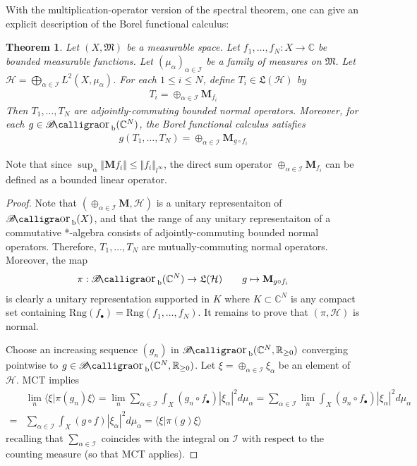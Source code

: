 \documentclass[12pt,b5paper,notitlepage]{article}
\theoremstyle{definition}
\theoremstyle{plain}
\newtheorem{thm}[df]{Theorem}
\DeclareMathOperator{\Borb}{{\mathscr{B}\text{\kern -2pt {\calligra\large or}}\,}_{\mathrm b}}
\newcommand{\fk}{\mathfrak}
\newcommand{\bk}[1]{\langle {#1}\rangle}
\newcommand{\blt}{\bullet}
\newcommand{\Cbb}{\mathbb C}
\newcommand{\Rbb}{\mathbb R}
\newcommand{\Rng}{\mathrm{Rng}}
\newcommand{\MH}{\mathcal H}
\newcommand{\SI}{\mathscr I}
\newcommand{\Mbf}{\mathbf M}
\numberwithin{equation}{section}
\begin{document}
With the multiplication-operator version of the spectral theorem, one can give an explicit description of the Borel functional calculus:





\begin{thm}\label{lb334}
Let $(X,\fk M)$ be a measurable space. Let $f_1,\dots,f_N:X\rightarrow\Cbb$ be bounded measurable functions. Let $(\mu_\alpha)_{\alpha\in\SI}$ be a family of measures on $\fk M$. Let $\MH=\bigoplus_{\alpha\in\SI}L^2(X,\mu_\alpha)$. For each $1\leq i\leq N$, define $T_i\in\fk L(\MH)$ by 
\begin{align*}
T_i=\oplus_{\alpha\in\SI}\Mbf_{f_i}
\end{align*}
Then $T_1,\dots,T_N$ are adjointly-commuting bounded normal operators. Moreover, for each $g\in\Borb(\Cbb^N)$, the Borel functional calculus satisfies
\begin{align}
g(T_1,\dots,T_N)=\oplus_{\alpha\in\SI}\Mbf_{g\circ f_i}
\end{align}
\end{thm}

Note that since $\sup_\alpha\Vert \Mbf f_i\Vert\leq \Vert f_i\Vert_{l^\infty}$, the direct sum operator $\oplus_{\alpha\in\SI}\Mbf_{f_i}$ can be defined as a bounded linear operator.


\begin{proof}
Note that $(\oplus_{\alpha\in\SI}\Mbf,\MH)$ is a unitary representaiton of $\Borb(X)$, and that the range of any unitary representaiton of a commutative *-algebra consists of adjointly-commuting bounded normal operators. Therefore,  $T_1,\dots,T_N$ are mutually-commuting normal operators. Moreover, the map
\begin{align*}
\pi:\Borb(\Cbb^N)\rightarrow \fk L(\MH)\qquad g\mapsto \Mbf_{g\circ f_i} 
\end{align*}
is clearly a unitary representation supported in $K$ where $K\subset\Cbb^N$ is any compact set containing $\Rng(f_\blt)=\Rng(f_1,\dots,f_N)$. It remains to prove that $(\pi,\MH)$ is normal.

Choose an increasing sequence $(g_n)$ in $\Borb(\Cbb^N,\Rbb_{\geq0})$ converging pointwise to $g\in \Borb(\Cbb^N,\Rbb_{\geq0})$. Let $\xi=\oplus_{\alpha\in\SI}\xi_\alpha$ be an element of $\MH$. MCT implies
\begin{align*}
&\lim_n\bk{\xi|\pi(g_n)\xi}=\lim_n \sum_{\alpha\in\SI}\int_X (g_n\circ f_\blt)|\xi_\alpha|^2d\mu_{\alpha}=\sum_{\alpha\in\SI}\lim_n\int_X (g_n\circ f_\blt)|\xi_\alpha|^2d\mu_{\alpha}\\
=&\sum_{\alpha\in\SI}\int_X (g\circ f)|\xi_\alpha|^2d\mu_{\alpha}=\bk{\xi|\pi(g)\xi}
\end{align*}
recalling that $\sum_{\alpha\in\SI}$ coincides with the integral on $\SI$ with respect to the counting measure (so that MCT applies).
\end{proof}
\end{document}

